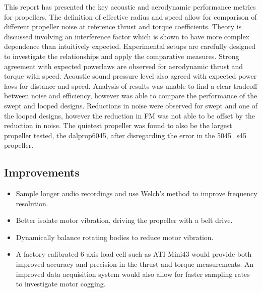 \documentclass[12pt,a4paper]{article}
\begin{document}

This report has presented the key acoustic and aerodynamic performance metrics for propellers.
The definition of effective radius and speed allow for comparison of different propeller noise at reference thrust and torque coefficients.
Theory is discussed involving an interference factor which is shown to have more complex dependence than intuitively expected.
Experimental setups are carefully designed to investigate the relationships and apply the comparative measures.
Strong agreement with expected powerlaws are observed for aerodynamic thrust and torque with speed.
Acoustic sound pressure level also agreed with expected power laws for distance and speed.
Analysis of results was unable to find a clear tradeoff between noise and efficiency, however was able to compare
the performance of the swept and looped designs.
Reductions in noise were observed for swept and one of the looped designs, however the reduction in FM was not able to be offset by the reduction in noise.
The quietest propeller was found to also be the largest propeller tested, the dalprop6045, after disregarding the error in the 5045\_s45 propeller.


\subsection{Improvements}


\begin{itemize}
    \item Sample longer audio recordings and use Welch's method to improve frequency resolution.
    \item Better isolate motor vibration, driving the propeller with a belt drive.
    \item Dynamically balance rotating bodies to reduce motor vibration.
    \item A factory calibrated 6 axis load cell such as ATI Mini43 would provide both improved accuracy and precision in the thrust and torque measurements.
        An improved data acquisition system would also allow for faster sampling rates to investigate motor cogging.
\end{itemize}
\end{document}
